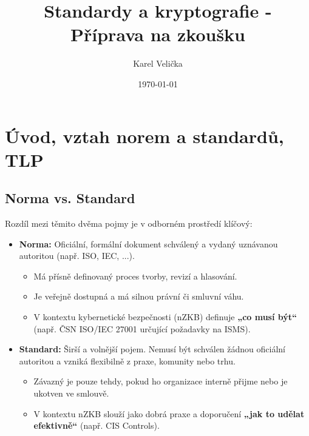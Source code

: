 \documentclass[10pt,a4paper]{article}
\title{Standardy a kryptografie - Příprava na zkoušku}
\date{\today}
\author{\sc Karel Velička}
\begin{document}
	\maketitle
	\tableofcontents
	\newpage
	
	
	\section{Úvod, vztah norem a standardů, TLP}
	
	\subsection{Norma vs. Standard}
	Rozdíl mezi těmito dvěma pojmy je v odborném prostředí klíčový:
	
	\begin{itemize}
		\item \textbf{Norma:} Oficiální, formální dokument schválený a vydaný uznávanou autoritou (např. ISO, IEC, ...).
		\begin{itemize}
			\item Má přísně definovaný proces tvorby, revizí a hlasování.
			\item Je veřejně dostupná a má silnou právní či smluvní váhu.
			\item V kontextu kybernetické bezpečnosti (nZKB) definuje \textbf{„co musí být“} (např. ČSN ISO/IEC 27001 určující požadavky na ISMS).
		\end{itemize}
		\item \textbf{Standard:} Širší a volnější pojem. Nemusí být schválen žádnou oficiální autoritou a vzniká flexibilně z praxe, komunity nebo trhu.
		\begin{itemize}
			\item Závazný je pouze tehdy, pokud ho organizace interně přijme nebo je ukotven ve smlouvě.
			\item V kontextu nZKB slouží jako dobrá praxe a doporučení \textbf{„jak to udělat efektivně“} (např. CIS Controls).
		\end{itemize}
	\end{itemize}
	
\end{document}
